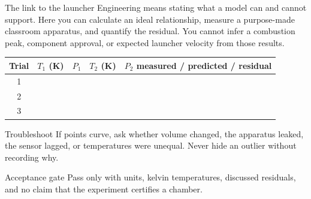 \begin{telospanel}{The link to the launcher}
Engineering means stating what a model can and cannot support. Here you can
calculate an ideal relationship, measure a purpose-made classroom apparatus,
and quantify the residual. You cannot infer a combustion peak, component
approval, or expected launcher velocity from those results.
\end{telospanel}
\begin{tabularx}{\linewidth}{@{}c c c c L@{}}
\toprule
\textbf{Trial} & $T_1$ (K) & $P_1$ & $T_2$ (K) &
$P_2$ measured / predicted / residual\\
 & & & & \rule{0pt}{2.6ex}\\
2 & & & &\\
3 & & & &\\
\bottomrule
\end{tabularx}
\begin{telospanel}{Troubleshoot}
If points curve, ask whether volume changed, the apparatus leaked, the sensor
lagged, or temperatures were unequal. Never hide an outlier without recording
why.
\end{telospanel}
\begin{teloshazard}{Acceptance gate}
Pass only with units, kelvin temperatures, discussed residuals, and no claim
that the experiment certifies a chamber.
\end{teloshazard}

